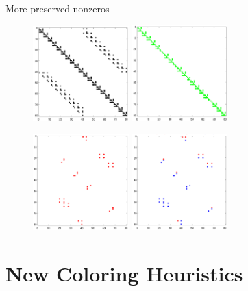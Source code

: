 \documentclass{beamer}
\begin{document}
\begin{frame}{More preserved nonzeros}
\begin{figure}
\centering
\includegraphics[width=0.33\textwidth]{nnz}
\includegraphics[width=0.33\textwidth]{R_i}
\end{figure}
\begin{figure}
\centering
\includegraphics[width=0.33\textwidth]{P}
\includegraphics[width=0.33\textwidth]{PA}
\end{figure}
\end{frame}

\section{New Coloring Heuristics}
\end{document}
